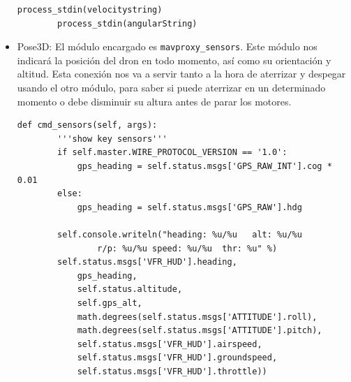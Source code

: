 \begin{itemize}
\begin{lstlisting}[frame=single]
        process_stdin(velocitystring) 
        process_stdin(angularString)
\end{lstlisting}


\item Pose3D: El módulo encargado es \texttt{mavproxy\_sensors}. Este módulo nos indicará la posición del dron en todo momento, así como su orientación y altitud. Esta conexión nos va a servir tanto a la hora de aterrizar y despegar usando el otro módulo, para saber si puede aterrizar en un determinado momento o debe disminuir su altura antes de parar los motores.

\begin{lstlisting}[frame=single]
    def cmd_sensors(self, args):
        '''show key sensors'''
        if self.master.WIRE_PROTOCOL_VERSION == '1.0':
            gps_heading = self.status.msgs['GPS_RAW_INT'].cog * 0.01
        else:
            gps_heading = self.status.msgs['GPS_RAW'].hdg

        self.console.writeln("heading: %u/%u   alt: %u/%u  
        		r/p: %u/%u speed: %u/%u  thr: %u" %)
        self.status.msgs['VFR_HUD'].heading,
            gps_heading,
            self.status.altitude,
            self.gps_alt,
            math.degrees(self.status.msgs['ATTITUDE'].roll),
            math.degrees(self.status.msgs['ATTITUDE'].pitch),
            self.status.msgs['VFR_HUD'].airspeed,
            self.status.msgs['VFR_HUD'].groundspeed,
			self.status.msgs['VFR_HUD'].throttle))
\end{lstlisting}
\end{itemize}